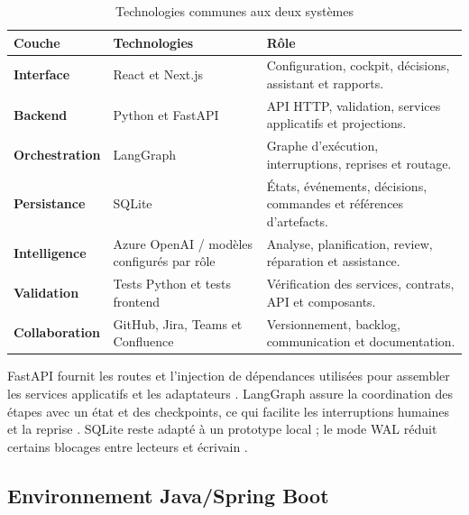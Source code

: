 \begin{table}[H]
    \centering
    \small
    \begin{tabularx}{\textwidth}{|>{\bfseries\RaggedRight\arraybackslash}p{3.8cm}|>{\RaggedRight\arraybackslash}p{4.4cm}|>{\RaggedRight\arraybackslash}X|}
        \hline
        \rowcolor{cgilight!95}
        \textbf{Couche} & \textbf{Technologies} & \textbf{Rôle} \\
        \hline
        Interface & React et Next.js & Configuration, cockpit, décisions, assistant et rapports. \\
        \hline
        Backend & Python et FastAPI & API HTTP, validation, services applicatifs et projections. \\
        \hline
        Orchestration & LangGraph & Graphe d'exécution, interruptions, reprises et routage. \\
        \hline
        Persistance & SQLite & États, événements, décisions, commandes et références d'artefacts. \\
        \hline
        Intelligence & Azure OpenAI / modèles configurés par rôle & Analyse, planification, review, réparation et assistance. \\
        \hline
        Validation & Tests Python et tests frontend & Vérification des services, contrats, API et composants. \\
        \hline
        Collaboration & GitHub, Jira, Teams et Confluence & Versionnement, backlog, communication et documentation. \\
        \hline
    \end{tabularx}
    \caption{Technologies communes aux deux systèmes}
    \label{tab:technologies-communes-ch4}
\end{table}

FastAPI fournit les routes et l'injection de dépendances utilisées pour assembler les services applicatifs et les adaptateurs \cite{fastapi-dependencies}. LangGraph assure la coordination des étapes avec un état et des checkpoints, ce qui facilite les interruptions humaines et la reprise \cite{langgraph-persistence}. SQLite reste adapté à un prototype local ; le mode WAL réduit certains blocages entre lecteurs et écrivain \cite{sqlite-wal}.

\subsection{Environnement Java/Spring Boot}


